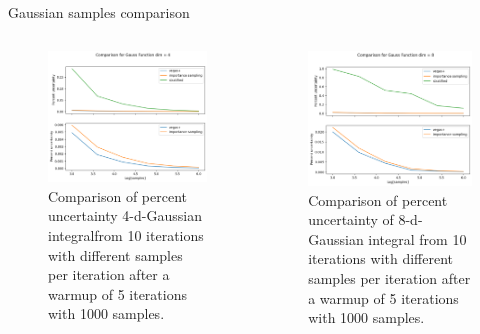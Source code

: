 \documentclass[t,handout,professionalfonts]{beamer}
\begin{document}
\begin{frame}{Gaussian samples comparison}
	\vspace{-0.5cm}
	\tiny
\begin{columns}[T]
	\begin{column}[T]{0.5 \textwidth}
		\begin{figure}
			\includegraphics[width=\columnwidth]{../plots/gauss_samples_symm_dim4_log.png}
			\caption{Comparison of  percent uncertainty 4-d-Gaussian integralfrom 10 iterations with different samples per iteration after a warmup of 5 iterations with 1000 samples.}
		\end{figure}
	\end{column}
	\begin{column}{0.5 \textwidth}
		\begin{figure}
			\includegraphics[width=\columnwidth]{../plots/gauss_samples_symm_dim8_log.png}
			\caption{Comparison of  percent uncertainty of  8-d-Gaussian integral from 10 iterations with different samples per iteration after a warmup of 5 iterations with 1000 samples.}
		\end{figure}
	\end{column}
\end{columns}
	

\end{frame}
\end{document}
